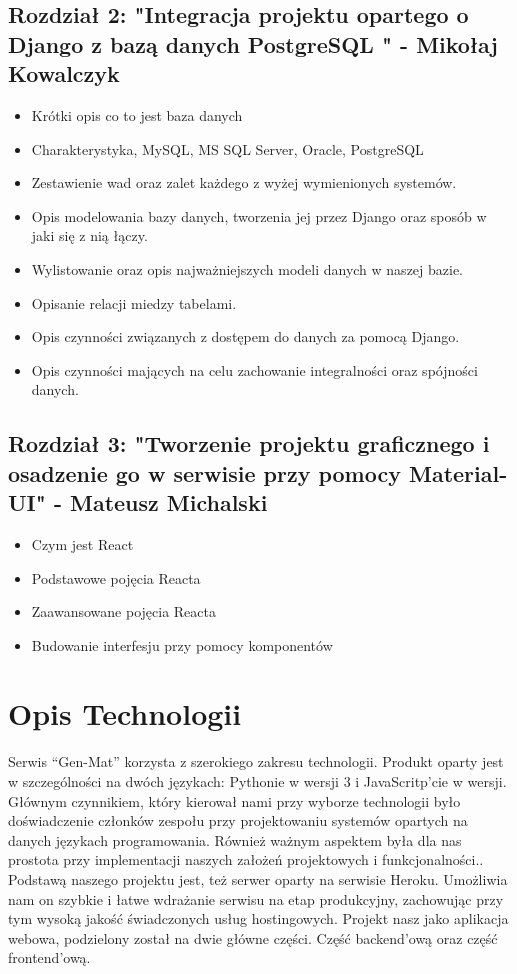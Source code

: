 \documentclass[oneside,polski,logo,indent]{amuthesis}
\begin{document}
\subsection{Rozdział 2: "Integracja projektu opartego o Django z bazą danych PostgreSQL " - Mikołaj Kowalczyk} 



\begin{itemize}
\item Krótki opis co to jest baza danych
\item Charakterystyka, MySQL, MS SQL Server, Oracle, PostgreSQL
\item Zestawienie wad oraz zalet każdego z wyżej wymienionych systemów.
\item Opis modelowania bazy danych, tworzenia jej przez Django oraz sposób w jaki się z nią łączy.
\item Wylistowanie oraz opis najważniejszych modeli danych w naszej bazie.
\item Opisanie relacji miedzy tabelami.
\item Opis czynności związanych z dostępem do danych za pomocą Django.
\item Opis czynności mających na celu zachowanie integralności oraz spójności danych.
\end{itemize}
\subsection{Rozdział 3: "Tworzenie projektu graficznego i osadzenie go w serwisie przy pomocy Material-UI" - Mateusz Michalski} 
\begin{itemize}
\item Czym jest React
\item Podstawowe pojęcia Reacta
\item Zaawansowane pojęcia Reacta
\item Budowanie interfesju przy pomocy komponentów
\end{itemize}
\section{Opis Technologii}
Serwis “Gen-Mat” korzysta z szerokiego zakresu technologii. Produkt oparty jest w szczególności na dwóch językach: Pythonie w wersji 3 i JavaScritp'cie w wersji. Głównym czynnikiem, który kierował nami przy wyborze technologii było doświadczenie członków zespołu przy projektowaniu systemów opartych na danych językach programowania. Również ważnym aspektem była dla nas prostota przy implementacji naszych założeń projektowych i funkcjonalności.. Podstawą naszego projektu jest, też serwer oparty na serwisie Heroku. Umożliwia nam on szybkie i łatwe wdrażanie serwisu na etap produkcyjny, zachowując przy tym wysoką jakość świadczonych usług hostingowych. Projekt nasz jako aplikacja webowa, podzielony został na dwie główne części. Część backend’ową oraz część frontend’ową.  
\end{document}
